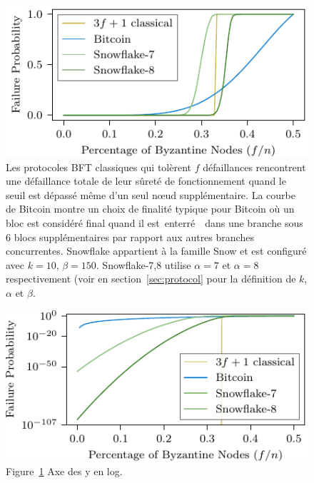 \documentclass[letterpaper,twocolumn,10pt]{article}
\newcommand{\tronly}[2]{#1}
\theoremstyle{definition}
\begin{document}
\begin{figure}[h]
    \includegraphics[width=\linewidth]{figures/safety-f-eps.pdf}
    \caption{Les protocoles BFT classiques qui tolèrent $f$ défaillances rencontrent une défaillance totale de leur sûreté de fonctionnement quand le seuil est dépassé même d'un seul nœud supplémentaire. La courbe de Bitcoin montre un choix de finalité typique pour Bitcoin où un bloc est considéré final quand il est \guillemotleft\,enterré\,\guillemotright~ dans une branche sous 6 blocs supplémentaires par rapport aux autres branches concurrentes. Snowflake appartient à la famille Snow et est configuré avec $k=10$, $\beta=150$. Snowflake-7,8 utilise $\alpha=7$ et $\alpha=8$ respectivement (voir en section~\ref{sec:protocol} pour la définition de $k$, $\alpha$ et $\beta$.}
    \label{fig:fandepsilon}
\end{figure}

\tronly{%
\begin{figure}[h]
    \includegraphics[width=\linewidth]{figures/safety-f-eps-log.pdf}
    \caption{Figure~\ref{fig:fandepsilon} Axe des y en log.}
    \label{fig:fandepsilonlog}
\end{figure}
}{}
\end{document}
